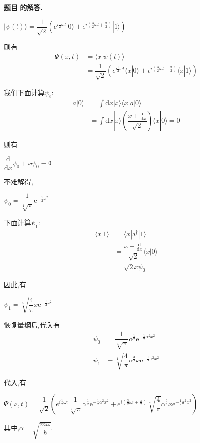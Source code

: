 \documentclass[12pt, a4paper, oneside]{ctexart}
\newcounter{problemname}
\newenvironment{solution}
  {\par\noindent\textbf{题目 \theproblemname 的解答. }}
  {\par}
\begin{document}
\begin{solution}
  \centerline{$| \psi(t) \rangle = \dfrac{1}{\sqrt{2}}(e^{i\frac{1}{2} \omega t}| 0 \rangle + e^{i(\frac{3}{2} \omega t+\frac{\pi}{2})}|1 \rangle)$}

  则有
  \begin{align*}
    \Psi(x,t) &= \langle x | \psi(t) \rangle\\
    &= \dfrac{1}{\sqrt{2}}(e^{i\frac{1}{2} \omega t}\langle x | 0 \rangle + e^{i(\frac{3}{2} \omega t+\frac{\pi}{2})}\langle x|1 \rangle)
  \end{align*}

  我们下面计算$\psi_0$:
  \begin{align*}
    a | 0 \rangle &= \displaystyle\int \mathrm{d}x  |x\rangle \langle x |a| 0 \rangle \\
    &= \displaystyle\int \mathrm{d}x  |x\rangle \left( \dfrac{x+\frac{\mathrm{d}}{\mathrm{d}x}}{\sqrt{2}}\right) \langle x | 0 \rangle = 0
  \end{align*}

  则有

  \centerline{$\dfrac{\mathrm{d}}{\mathrm{d}x} \psi_0+x\psi_0 = 0$}

  不难解得,

  \centerline{$\psi_0 = \dfrac{1}{\sqrt[4]{\pi}} \mathrm{e}^{-\frac{1}{2}x^2}$}

  下面计算$\psi_1$:
  \begin{align*}
    \langle x | 1 \rangle &= \langle x| a^\dagger | 1 \rangle\\
    &= \dfrac{x-\frac{\mathrm{d}}{\mathrm{d}x}}{\sqrt{2}} \langle x| 0\rangle\\
    &= \sqrt{2}x \psi_0
  \end{align*}

  因此,有

  \centerline{$\psi_1 = \sqrt[4]{\dfrac{4}{\pi}} x\mathrm{e}^{-\frac{1}{2}x^2}$}

  恢复量纲后,代入有
  \begin{align*}
    \psi_0 &= \dfrac{1}{\sqrt[4]{\pi}} \alpha^{\frac{1}{2}} \mathrm{e}^{-\frac{1}{2}\alpha^2x^2}\\
    \psi_1 &= \sqrt[4]{\dfrac{4}{\pi}} \alpha^{\frac{3}{2}} x\mathrm{e}^{-\frac{1}{2}\alpha^2x^2}
  \end{align*}

  代入,有

  \centerline{$\Psi(x,t) = \dfrac{1}{\sqrt{2}}(e^{i\frac{1}{2} \omega t}\dfrac{1}{\sqrt[4]{\pi}} \alpha^{\frac{1}{2}} \mathrm{e}^{-\frac{1}{2}\alpha^2x^2} + e^{i(\frac{3}{2} \omega t+\frac{\pi}{2})}\sqrt[4]{\dfrac{4}{\pi}} \alpha^{\frac{3}{2}} x\mathrm{e}^{-\frac{1}{2}\alpha^2x^2})$}

  其中,$\alpha = \sqrt{\dfrac{m\omega}{\hbar}}$.
\end{solution}
\end{document}
